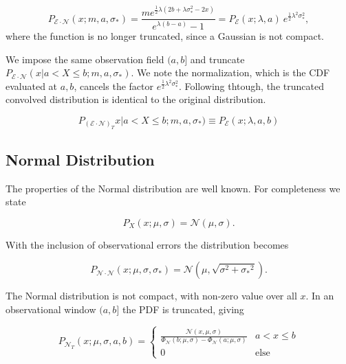 \documentclass[twocolumn]{aastex631}
\newcommand{\mcal}[1]{\mathcal{#1}}
\newcommand{\pdf}{P}
\newcommand{\Exp}[1]{e^{#1}}
\newcommand{\sigobs}{{\sigma_*}}
\begin{document}
        \begin{equation}
            \pdf_{\mcal{E}\cdot\mcal{N}}(x;m,a,\sigma_*) = \frac{m  e^{\frac{1}{2} \lambda  \left(2 b+\lambda  \sigma _*^2-2 x\right)}}{e^{\lambda  (b-a)}-1} = \pdf_{\mcal{E}}(x;\lambda,a) \ \Exp{\frac{1}{2}\lambda^2 \sigma_*^2},
        \end{equation}
        where the function is no longer truncated, since a Gaussian is not compact.

        We impose the same observation field $(a, b]$ and truncate $\pdf_{\mcal{E}\cdot\mcal{N}}(x | a < X \leq b;m,a,\sigma_*)$.
        We note the normalization, which is the CDF evaluated at $a, b$, cancels the factor
        $\Exp{\frac{1}{2}\lambda^2 \sigma_*^2}$. Following thtough, the truncated convolved distribution is identical to the original distribution.

        \begin{equation}
            \pdf_{(\mcal{E}\cdot\mcal{N})_T}x | a < X \leq b;m,a,\sigma_*) \equiv \pdf_{\mcal{E}}(x; \lambda, a, b)
        \end{equation}

    \vspace{10pt}
    \subsection{Normal Distribution}

        The properties of the Normal distribution are well known. For completeness we state

        \begin{equation}
            P_X(x; \mu, \sigma) = \mcal{N}(\mu, \sigma).
        \end{equation}

        With the inclusion of observational errors the distribution becomes

        \begin{equation}
            P_{\mcal{N}\cdot\mcal{N}}(x; \mu, \sigma, \sigobs) = \mcal{N}(\mu, \sqrt{\sigma^2 + \sigobs^2}).
        \end{equation}

        The Normal distribution is not compact, with non-zero value over all $x$. In an observational window $(a,b]$ the PDF is truncated, giving

        \begin{equation}
            P_{\mcal{N}_T}(x; \mu, \sigma, a, b) = \begin{cases}
                \frac{\mcal{N}(x, \mu, \sigma)}{\Phi_\mcal{N}(b; \mu, \sigma) - \Phi_\mcal{N}(a; \mu, \sigma)} & a < x \leq b \\
                0 & \text{else}
            \end{cases}
        \end{equation}
\end{document}

